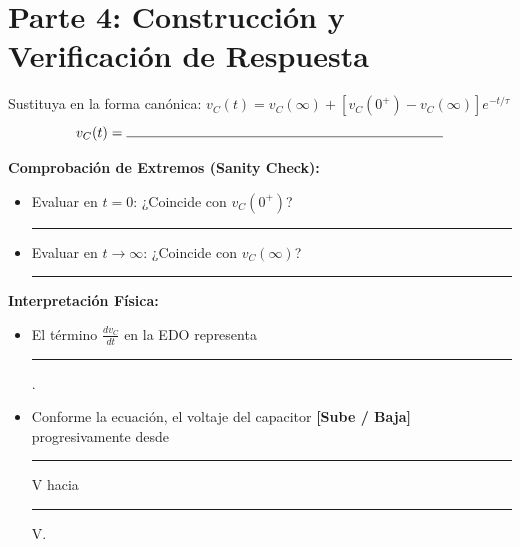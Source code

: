 \documentclass[11pt, a4paper]{article}
\begin{document}
\section*{Parte 4: Construcción y Verificación de Respuesta}
Sustituya en la forma canónica: $v_C(t) = v_C(\infty) + [v_C(0^+) - v_C(\infty)]e^{-t/\tau}$
\begin{equation}
    v_C(t) = \rule{8cm}{0.4pt}
\end{equation}

\textbf{Comprobación de Extremos (Sanity Check):}
\begin{itemize}
    \item Evaluar en $t=0$: ¿Coincide con $v_C(0^+)$? \rule{3cm}{0.4pt}
    \item Evaluar en $t \to \infty$: ¿Coincide con $v_C(\infty)$? \rule{3cm}{0.4pt}
\end{itemize}

\textbf{Interpretación Física:}
\begin{itemize}
    \item El término $\frac{dv_C}{dt}$ en la EDO representa \rule{8cm}{0.4pt}.
    \item Conforme la ecuación, el voltaje del capacitor \textbf{[Sube / Baja]} progresivamente desde \rule{2cm}{0.4pt} V hacia \rule{2cm}{0.4pt} V.
\end{itemize}
\end{document}
